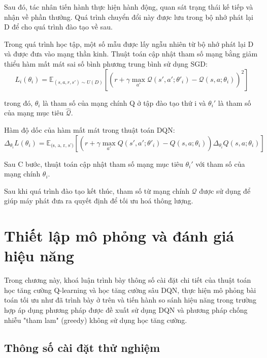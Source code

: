 \documentclass{uetgraduation}
\begin{document}
Sau đó, tác nhân tiến hành thực hiện hành động, quan sát trạng thái kế tiếp và nhận về phần thưởng. Quá trình chuyển đổi này được lưu trong bộ nhớ phát lại D để cho
quá trình đào tạo về sau.

Trong quá trình học tập, một số mẫu được lấy ngẫu nhiên từ bộ nhớ phát lại D và được đưa vào mạng thần kinh. Thuật toán cập nhật tham số mạng bằng giảm thiểu hàm mất mát sai
số bình phương trung bình sử dụng SGD:
\begin{equation}
    L_i(\theta_i) = \mathbb{E}_{(s, a, r, s') \sim U(D)} \left[ \left( r + \gamma \max_{a'} \mathcal{Q}(s', a'; \theta'_i) - \mathcal{Q}(s, a; \theta_i) \right)^2 \right]
\end{equation}

trong đó, $\theta_i$ là tham số của mạng chính Q ở tập đào tạo thứ i và $\theta_i'$ là tham số của mạng mục tiêu $\hat{\mathcal{Q}}$.

Hàm độ dốc của hàm mất mát trong thuật toán DQN:
\begin{equation}
    \Delta_{\theta_i} L(\theta_i) = \mathbb{E}_\text{(s, a, r, s')} [(r + \gamma \max_{a'} Q(s', a'; \theta'_i) - Q(s, a; \theta_i)) \Delta_{\theta_i} Q(s, a; \theta_i)] 
\end{equation}

Sau C bước, thuật toán cập nhật tham số mạng mục tiêu $\theta_i'$ với tham số của mạng chính $\theta_i$.

Sau khi quá trình đào tạo kết thúc, tham số từ mạng chính $\mathcal{Q}$ được sử dụng để giúp máy phát đưa ra quyết định để tối ưu hoá thông lượng.

\chapter{Thiết lập mô phỏng và đánh giá hiệu năng}
Trong chương này, khoá luận trình bày thông số cài đặt chi tiết của thuật toán học tăng cường Q-learning và học tăng cường sâu DQN, thực hiện mô phỏng bài toán tối ưu
như đã trình bày ở trên và tiến hành so sánh hiệu năng trong trường hợp áp dụng phương pháp được đề xuất sử dụng DQN và phương pháp chống nhiễu "tham lam" (greedy) không sử dụng học
tăng cường.

\section{Thông số cài đặt thử nghiệm}
\end{document}
